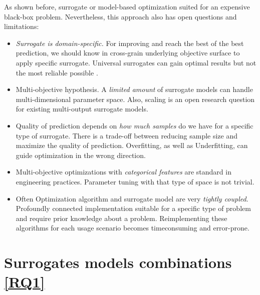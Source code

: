     As shown before, surrogate or model-based optimization suited for an expensive black-box problem. Nevertheless, this approach also has open questions and limitations:
    \begin{itemize}
        \item \emph{Surrogate is domain-specific.} For improving and reach the best of the best prediction, we should know in cross-grain underlying objective surface to apply specific surrogate. Universal surrogates can gain optimal results but not the most reliable possible \cite{abs181207958, LuST19}.
        \item Multi-objective hypothesis. A \emph{limited amount} of surrogate models can handle multi-dimensional parameter space. Also, scaling is an open research question for existing multi-output surrogate models.
        \item Quality of prediction depends on \emph{how much samples} do we have for a specific type of surrogate. There is a trade-off between reducing sample size and maximize the quality of prediction. Overfitting, as well as Underfitting, can guide optimization in the wrong direction.
        \item Multi-objective optimizations with \emph{categorical features} are standard in engineering practices. Parameter tuning with that type of space is not trivial.
        \item Often Optimization algorithm and surrogate model are very \emph{tightly coupled}. Profoundly connected implementation suitable for a specific type of problem and require prior knowledge about a problem. Reimplementing these algorithms for each usage scenario becomes timeconsuming and error-prone.
    \end{itemize}

    



    \section{Surrogates models combinations \ref{RQ1}}


